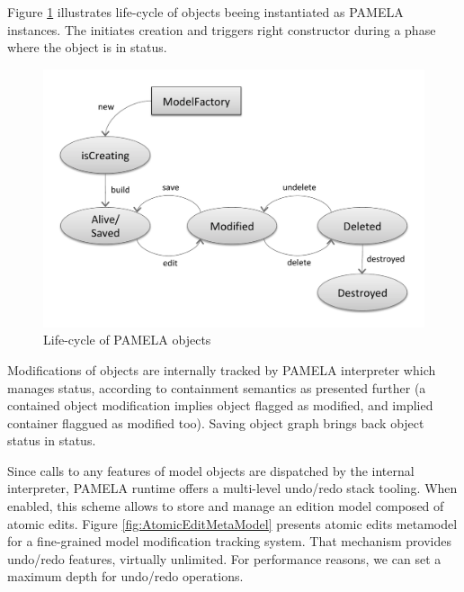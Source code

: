 Figure \ref{fig:LifeCycle} illustrates life-cycle of objects beeing instantiated as PAMELA instances. The  initiates creation and triggers right constructor during a phase where the object is in  status.

\begin{figure}
    \centering
    \includegraphics[width=0.9 \columnwidth]{LifeCycle.pdf}
    \caption{Life-cycle of PAMELA objects}
    \label{fig:LifeCycle}
\end{figure}

Modifications of objects are internally tracked by PAMELA interpreter which manages  status, according to containment semantics as presented further (a contained object modification implies object flagged as modified, and implied container flaggued as modified too). Saving object graph brings back object status in  status.

Since calls to any features of model objects are dispatched by the internal interpreter, PAMELA runtime offers a multi-level undo/redo stack tooling. When enabled, this scheme allows to store and manage an edition model composed of atomic edits. Figure \ref{fig:AtomicEditMetaModel} presents atomic edits metamodel for a fine-grained model modification tracking system. That mechanism provides undo/redo features, virtually unlimited. For performance reasons, we can set a maximum depth for undo/redo operations.

